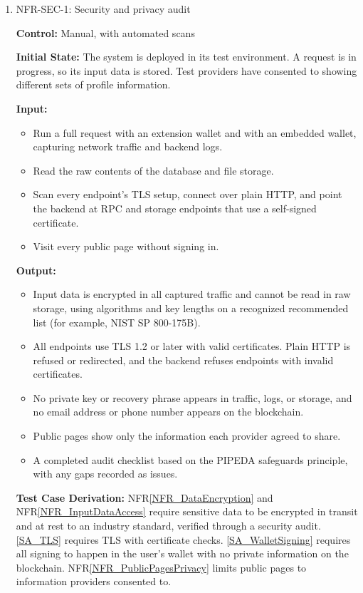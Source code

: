 \documentclass[12pt]{article}
\newcommand{\nfrref}[1]{NFR\ref{#1}}
\newcommand{\saref}[1]{\ref{#1}}
\begin{document}
\begin{enumerate}

\item{NFR-SEC-1: Security and privacy audit\\}

\textbf{Control:} Manual, with automated scans

\textbf{Initial State:} The system is deployed in its test environment. A request is in
progress, so its input data is stored. Test providers have consented to
showing different sets of profile information.

\textbf{Input:}
\begin{itemize}
\item[1.] Run a full request with an extension wallet and with an embedded wallet,
capturing network traffic and backend logs.
\item[2.] Read the raw contents of the database and file storage.
\item[3.] Scan every endpoint's TLS setup, connect over plain HTTP, and point the
backend at RPC and storage endpoints that use a self-signed certificate.
\item[4.] Visit every public page without signing in.
\end{itemize}

\textbf{Output:}
\begin{itemize}
\item[1.] Input data is encrypted in all captured traffic and cannot be read in
raw storage, using algorithms and key lengths on a recognized recommended list
(for example, NIST SP 800-175B).
\item[2.] All endpoints use TLS 1.2 or later with valid certificates. Plain HTTP
is refused or redirected, and the backend refuses endpoints with invalid
certificates.
\item[3.] No private key or recovery phrase appears in traffic, logs, or storage,
and no email address or phone number appears on the blockchain.
\item[4.] Public pages show only the information each provider agreed to share.
\item[5.] A completed audit checklist based on the PIPEDA safeguards principle,
with any gaps recorded as issues.
\end{itemize}

\textbf{Test Case Derivation:} \nfrref{NFR_DataEncryption} and \nfrref{NFR_InputDataAccess} require sensitive data to be encrypted in
transit and at rest to an industry standard, verified through a security
audit. \saref{SA_TLS} requires TLS with certificate checks. \saref{SA_WalletSigning} requires all
signing to happen in the user's wallet with no private information on the
blockchain. \nfrref{NFR_PublicPagesPrivacy} limits public pages to information providers consented to.


\end{enumerate}
\end{document}
